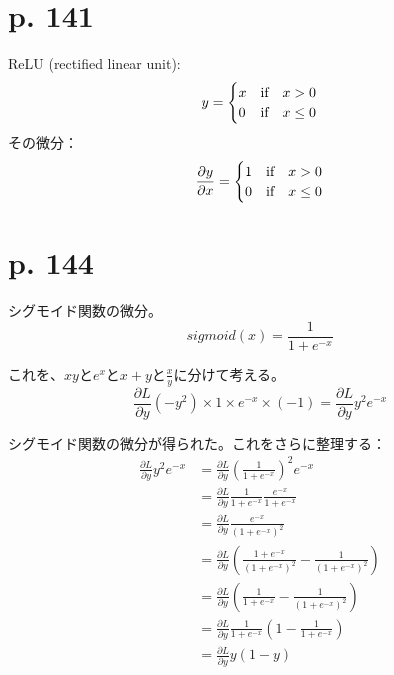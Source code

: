 \documentclass[uplatex,dvipdfmx]{jsarticle} \usepackage{amsmath,amssymb,bm}
\begin{document}
\section*{p. 141}
ReLU (rectified linear unit):
$$y = 
\begin{cases}
x & \text{if\quad} x>0\\
0 & \text{if\quad} x\leq0
\end{cases}
$$
その微分：
$$\frac{\partial y}{\partial x} = 
\begin{cases}
1 & \text{if\quad} x>0\\
0 & \text{if\quad} x\leq0
\end{cases}
$$

\section*{p. 144}
シグモイド関数の微分。
$$sigmoid(x)=\frac{1}{1+e^{-x}}$$

これを、$xy$と$e^x$と$x+y$と$\frac{x}y$に分けて考える。
$$\frac{\partial L}{\partial y}(-y^2)\times1\times e^{-x}\times(-1) = \frac{\partial L}{\partial y}y^2 e^{-x}$$

シグモイド関数の微分が得られた。これをさらに整理する：
\begin{align*}
\frac{\partial L}{\partial y}y^2 e^{-x} &= \frac{\partial L}{\partial y} \left( \frac{1}{1+e^{-x}} \right)^2 e^{-x} \\
&=  \frac{\partial L}{\partial y} \frac{1}{1+e^{-x}} \frac{e^{-x}}{1+e^{-x}} \\
&=  \frac{\partial L}{\partial y} \frac{e^{-x}}{(1+e^{-x})^2} \\
&=  \frac{\partial L}{\partial y} \left( \frac{1+e^{-x}}{(1+e^{-x})^2} - \frac{1}{(1+e^{-x})^2} \right) \\
&=  \frac{\partial L}{\partial y} \left( \frac{1}{1+e^{-x}} - \frac{1}{(1+e^{-x})^2} \right) \\
&=  \frac{\partial L}{\partial y} \frac{1}{1+e^{-x}} \left( 1 - \frac{1}{1+e^{-x}} \right) \\
&=  \frac{\partial L}{\partial y} y (1-y) \\
\end{align*}


\vspace{\baselineskip}
\begin{paracol}{2}
\switchcolumn
\end{paracol}
\end{document}

